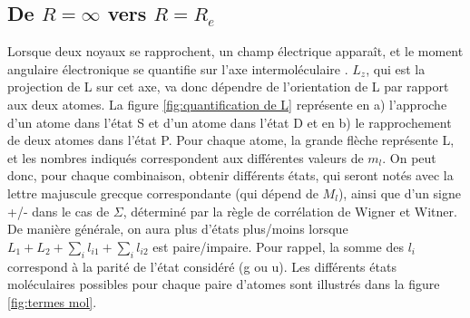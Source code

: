 \subsection{De $R=\infty$ vers $R=R_e$}

Lorsque deux noyaux se rapprochent, un champ électrique apparaît, et le moment angulaire électronique se quantifie sur l'axe intermoléculaire . $L_z$, qui est la projection de L sur cet axe, va donc dépendre de l'orientation de L par rapport aux deux atomes. La figure \ref{fig:quantification de L} représente en a) l'approche d'un atome dans l'état S et d'un atome dans l'état D et en b) le rapprochement de deux atomes dans l'état P. Pour chaque atome, la grande flèche représente L, et les nombres indiqués correspondent aux différentes valeurs de $m_l$. On peut donc, pour chaque combinaison, obtenir différents états, qui seront notés avec la lettre majuscule grecque correspondante (qui dépend de $M_l$), ainsi que d'un signe +/- dans le cas de $\Sigma$, déterminé par la règle de corrélation de Wigner et Witner. De manière générale, on aura plus d'états plus/moins lorsque $L_1+L_2+\sum_il_{i1}+\sum_il_{i2}$ est paire/impaire. Pour rappel, la somme des $l_i$ correspond à la parité de l'état considéré (g ou u). Les différents états moléculaires possibles pour chaque paire d'atomes sont illustrés dans la figure \ref{fig:termes mol}.

